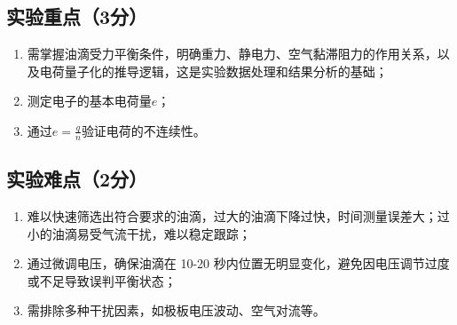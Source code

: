 \documentclass[yuxi]{../../templates/Report}%
\begin{document}
\subsection{实验重点（3分）}
\begin{enumerate}
    \item 需掌握油滴受力平衡条件，明确重力、静电力、空气黏滞阻力的作用关系，以及电荷量子化的推导逻辑，这是实验数据处理和结果分析的基础；
    \item 测定电子的基本电荷量$e$；
    \item 通过\(e = \frac{q}{n}\)验证电荷的不连续性。
\end{enumerate}

\subsection{实验难点（2分）}
\begin{enumerate}
    \item 难以快速筛选出符合要求的油滴，过大的油滴下降过快，时间测量误差大；过小的油滴易受气流干扰，难以稳定跟踪；
    \item 通过微调电压，确保油滴在 10-20 秒内位置无明显变化，避免因电压调节过度或不足导致误判平衡状态；
    \item 需排除多种干扰因素，如极板电压波动、空气对流等。
\end{enumerate}
\end{document}
